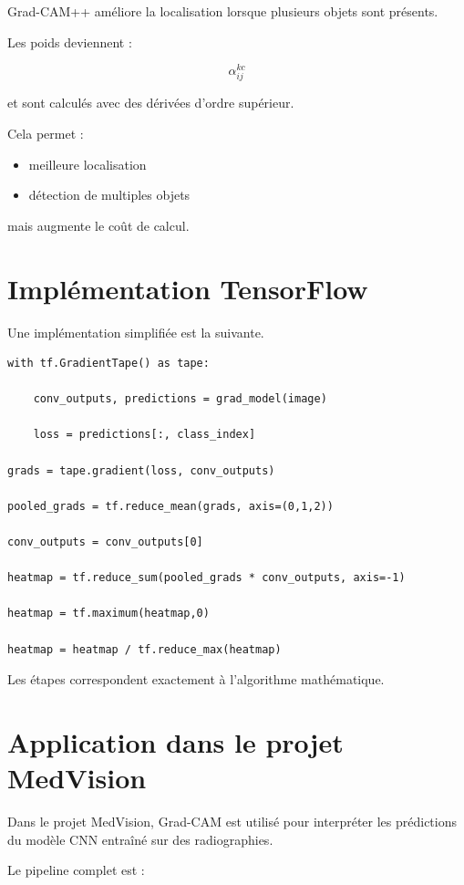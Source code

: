 ﻿\documentclass[11pt,a4paper]{article}
\begin{document}
Grad-CAM++ améliore la localisation lorsque plusieurs objets sont présents.

Les poids deviennent :

\[
\alpha_{ij}^{kc}
\]

et sont calculés avec des dérivées d'ordre supérieur.

Cela permet :

\begin{itemize}
\item meilleure localisation
\item détection de multiples objets
\end{itemize}

mais augmente le coût de calcul.

\section{Implémentation TensorFlow}

Une implémentation simplifiée est la suivante.

\begin{verbatim}
with tf.GradientTape() as tape:

    conv_outputs, predictions = grad_model(image)

    loss = predictions[:, class_index]

grads = tape.gradient(loss, conv_outputs)

pooled_grads = tf.reduce_mean(grads, axis=(0,1,2))

conv_outputs = conv_outputs[0]

heatmap = tf.reduce_sum(pooled_grads * conv_outputs, axis=-1)

heatmap = tf.maximum(heatmap,0)

heatmap = heatmap / tf.reduce_max(heatmap)
\end{verbatim}

Les étapes correspondent exactement à l'algorithme mathématique.

\section{Application dans le projet MedVision}

Dans le projet MedVision, Grad-CAM est utilisé pour interpréter les prédictions du modèle CNN entraîné sur des radiographies.

Le pipeline complet est :
\end{document}
